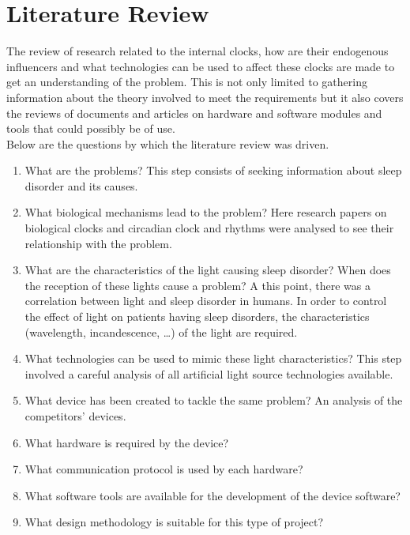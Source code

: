 \section{Literature Review}
The review of research related to the internal clocks, how are their endogenous influencers and what technologies can be used to affect these clocks are made to get an understanding of the problem. This is not only limited to gathering information about the theory involved to meet the requirements but it also covers the reviews of documents and articles on hardware and software modules and tools that could possibly be of use.\\
Below are the questions by which the literature review was driven.
\begin{enumerate}
\item What are the problems? This step consists of seeking information about sleep disorder and its causes.
\item What biological mechanisms lead to the problem? Here research papers on biological clocks and circadian clock and rhythms were analysed to see their relationship with the problem.
\item What are the characteristics of the light causing sleep disorder? When does the reception of these lights cause a problem? A this point, there was a correlation between light and sleep disorder in humans. In order to control the effect of light on patients having sleep disorders, the characteristics (wavelength, incandescence, \ldots) of the light are required.
\item What technologies can be used to mimic these light characteristics? This step involved a careful analysis of all artificial light source technologies available.
\item What device has been created to tackle the same problem? An analysis of the competitors' devices.
\item What hardware is required by the device?
\item What communication protocol is used by each hardware?
\item What software tools are available for the development of the device software?
\item What design methodology is suitable for this type of project?
\end{enumerate}

